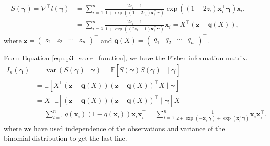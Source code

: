 \documentclass[letterpaper,11pt]{article}
\begin{document}
\begin{enumerate}
\begin{description}
    \begin{align}
      S\left(\bm\gamma\right)
      = \nabla^\intercal l\left(\bm\gamma\right)
      &= \sum_{i=1}^n \frac{2z_i - 1}{1 + \exp\left(
        \left(1 - 2z_i\right)\mathbf{x}_i^\intercal\bm{\gamma}
        \right)}\exp\left(
        \left(1 - 2z_i\right)\mathbf{x}_i^\intercal\bm{\gamma}
        \right)\mathbf{x}_i.
        \nonumber\\
      &= \sum_{i=1}^n \frac{2z_i - 1}{1 + \exp\left(
        \left(2z_i - 1\right)\mathbf{x}_i^\intercal\bm{\gamma}
        \right)}\mathbf{x}_i 
      = X^\intercal\left(
        \mathbf{z} - \mathbf{q}\left(X\right)
        \right),
    \label{eqn:p3_score_function}
    \end{align}
    where
    $\mathbf{z} = \begin{pmatrix}z_1 & z_2 & \cdots & z_n\end{pmatrix}^\intercal$ and
    $\mathbf{q}\left(X\right) = \begin{pmatrix}q_1 & q_2 &
      \cdots & q_n\end{pmatrix}^\intercal$.
    
    From Equation \ref{eqn:p3_score_function}, we have the Fisher information
    matrix:
    \begin{align}
      I_n\left(\bm\gamma\right)
      &= \operatorname{var}\left(S\left(\bm\gamma\right) \mid \bm\gamma\right)
        = \mathbb{E}\left[
        S\left(\bm\gamma\right)
        S\left(\bm\gamma\right)^\intercal
        \mid \bm\gamma
        \right] \nonumber\\
      &= \mathbb{E}\left[
        X^\intercal\left(
        \mathbf{z} - \mathbf{q}\left(X\right)
        \right)
        \left(
        \mathbf{z} - \mathbf{q}\left(X\right)
        \right)^\intercal
        X \mid \bm\gamma
        \right] \nonumber \\
      &= X^\intercal\mathbb{E}\left[
        \left(
        \mathbf{z} - \mathbf{q}\left(X\right)
        \right)
        \left(
        \mathbf{z} - \mathbf{q}\left(X\right)
        \right)^\intercal
        \mid \bm\gamma
        \right]X \nonumber\\
      &= \sum_{i=1}^n 
        q\left(\mathbf{x}_i\right)
        \left(1 - q\left(\mathbf{x}_i\right)\right)
        \mathbf{x}_i\mathbf{x}_i^\intercal
        =
        \sum_{i=1}^n
        \frac{1}{2 + \exp\left(
        -\mathbf{x}_i^\intercal \bm\gamma
        \right) + \exp\left(
        \mathbf{x}_i^\intercal \bm\gamma
        \right)}
        \mathbf{x}_i\mathbf{x}_i^\intercal
        ,
        \label{eqn:p3_fisher_information}
    \end{align}
    where we have used independence of the observations and variance of the
    binomial distribution to get the last line.


\end{description}
\end{enumerate}
\end{document}
